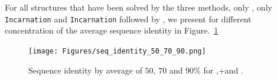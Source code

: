  For all structures that have been solved 
by the three methods, only \RNASSD, only \texttt{Incarnation} and
\texttt{Incarnation} followed by \RNAinverse, 
we present for different concentration of \GCContent the average sequence identity in Figure.~\ref{fig:identity_50_70_90}

\begin{figure}[ht!]
  \centering
  \texttt{[image: Figures/seq\_identity\_50\_70\_90.png]}
  \caption{Sequence identity by average \GCContent of $50$, $70$ and $90\%$ for \ourprog,\ourprog+\RNAinverse and \RNASSD.}
  \label{fig:identity_50_70_90}
\end{figure}






%

